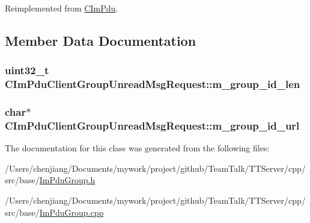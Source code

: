 Reimplemented from \hyperlink{class_c_im_pdu_a887912f445b3e864d33f9e7f2325f1fc}{C\+Im\+Pdu}.



\subsection{Member Data Documentation}
\hypertarget{class_c_im_pdu_client_group_unread_msg_request_a752b8ab3028c83b2e67f6a4cc8d71603}{}
\subsubsection[{m\+\_\+group\+\_\+id\+\_\+len}]{\setlength{\rightskip}{0pt plus 5cm}uint32\+\_\+t C\+Im\+Pdu\+Client\+Group\+Unread\+Msg\+Request\+::m\+\_\+group\+\_\+id\+\_\+len\hspace{0.3cm}{\ttfamily [private]}}\label{class_c_im_pdu_client_group_unread_msg_request_a752b8ab3028c83b2e67f6a4cc8d71603}
\hypertarget{class_c_im_pdu_client_group_unread_msg_request_ab486e58dbf78c49038bf854d0ba36eb3}{}
\subsubsection[{m\+\_\+group\+\_\+id\+\_\+url}]{\setlength{\rightskip}{0pt plus 5cm}char$\ast$ C\+Im\+Pdu\+Client\+Group\+Unread\+Msg\+Request\+::m\+\_\+group\+\_\+id\+\_\+url\hspace{0.3cm}{\ttfamily [private]}}\label{class_c_im_pdu_client_group_unread_msg_request_ab486e58dbf78c49038bf854d0ba36eb3}


The documentation for this class was generated from the following files\+:\begin{DoxyCompactItemize}
\item 
/\+Users/chenjiang/\+Documents/mywork/project/github/\+Team\+Talk/\+T\+T\+Server/cpp/src/base/\hyperlink{_im_pdu_group_8h}{Im\+Pdu\+Group.\+h}\item 
/\+Users/chenjiang/\+Documents/mywork/project/github/\+Team\+Talk/\+T\+T\+Server/cpp/src/base/\hyperlink{_im_pdu_group_8cpp}{Im\+Pdu\+Group.\+cpp}\end{DoxyCompactItemize}

